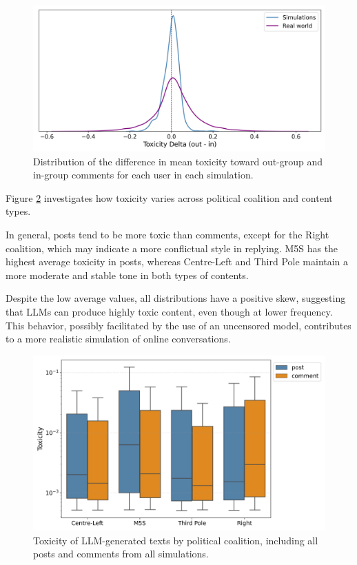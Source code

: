 \begin{figure}[h]
    \centering
    \includegraphics[width=1\linewidth]{Images/Toxicity/diff_in_out_combined.png}
    \caption{Distribution of the difference in mean toxicity toward out-group and in-group comments for each user in each simulation.}
    \label{fig:toxicity_in_out}
\end{figure}


\medskip
Figure \ref{fig:toxicity_box} investigates how toxicity varies across political coalition and content types.

In general, posts tend to be more toxic than comments, except for the Right coalition, which may indicate a more conflictual style in replying.
M5S has the highest average toxicity in posts, whereas Centre-Left and Third Pole maintain a more moderate and stable tone in both types of contents.

Despite the low average values, all distributions have a positive skew, suggesting that LLMs can produce highly toxic content, even though at lower frequency.
This behavior, possibly facilitated by the use of an uncensored model, contributes to a more realistic simulation of online conversations.


\begin{figure}[h]
    \centering
    \includegraphics[width=1\linewidth]{Images/Toxicity/box_posts_vs_comments.png}
    \caption{Toxicity of LLM-generated texts by political coalition, including all posts and comments from all simulations.}
    \label{fig:toxicity_box}
\end{figure}


